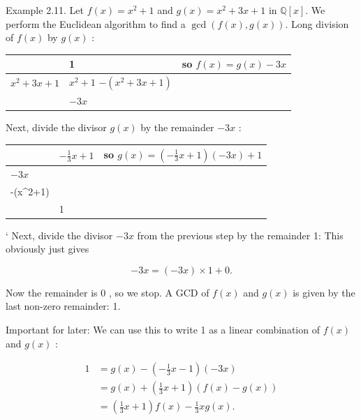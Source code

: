 \begin{example}
  Example 2.11. Let \(f(x)=x^2+1\) and \(g(x)=x^2+3 x+1\) in \(\mathbb{Q}[x]\). We perform the Euclidean algorithm to find a \(\operatorname{gcd}(f(x), g(x))\). Long division of \(f(x)\) by \(g(x)\) :


\begin{centering}

  \begin{tabular}[h!]{|l|l|l|}
\hline & 1 & \multirow{3}{*}{so \(f(x)=g(x)-3 x\)} \\
\hline \(x^2+3 x+1\) & \(x^2+1\) \(-\left(x^2+3 x+1\right)\) & \\
\hline & \(-3 x\) & \\
\hline
\end{tabular}

\end{centering}

Next, divide the divisor \(g(x)\) by the remainder \(-3 x\) :

\begin{centering}
  \begin{tabular}[h!]{|l|l|l|}
\hline & \(-\frac{1}{3} x+1\) & \multirow{3}{*}{so \(g(x)=\left(-\frac{1}{3} x+1\right)(-3 x)+1\)} \\
\hline \(-3 x\) & \[
\begin{gathered}
x^2+3 x+1 \\
-\left(x^2+1\right)
\end{gathered}
\] & \\
\hline & 1 & \\
\hline
\end{tabular}

\end{centering}


`
Next, divide the divisor \(-3 x\) from the previous step by the remainder 1: This obviously just gives

\[
-3 x=(-3 x) \times 1+0 .
\]

Now the remainder is 0 , so we stop. A GCD of \(f(x)\) and \(g(x)\) is given by the last non-zero remainder: 1.

Important for later: We can use this to write 1 as a linear combination of \(f(x)\) and \(g(x)\) :

\[
\begin{aligned}
1 & =g(x)-\left(-\frac{1}{3} x-1\right)(-3 x) \\
& =g(x)+\left(\frac{1}{3} x+1\right)(f(x)-g(x)) \\
& =\left(\frac{1}{3} x+1\right) f(x)-\frac{1}{3} x g(x) .
\end{aligned}
\]


\end{example}

